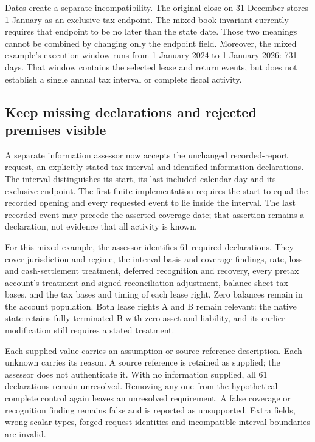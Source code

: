 Dates create a separate incompatibility. The original close on 31 December
stores 1 January as an exclusive tax endpoint. The mixed-book invariant
currently requires that endpoint to be no later than the state date. Those
two meanings cannot be combined by changing only the endpoint field. Moreover,
the mixed example's execution window runs from 1 January 2024 to 1 January 2026:
731 days. That window contains the selected lease and return events, but does
not establish a single annual tax interval or complete fiscal activity.

\subsection{Keep missing declarations and rejected premises visible}

A separate information assessor now accepts the unchanged recorded-report
request, an explicitly stated tax interval and identified information
declarations. The interval distinguishes its start, its last included calendar
day and its exclusive endpoint. The first finite implementation requires the
start to equal the recorded opening and every requested event to lie inside
the interval. The last recorded event may precede the asserted coverage date;
that assertion remains a declaration, not evidence that all activity is known.

For this mixed example, the assessor identifies 61 required declarations. They
cover jurisdiction and regime, the interval basis and coverage findings, rate,
loss and cash-settlement treatment, deferred recognition and recovery, every
pretax account's treatment and signed reconciliation adjustment, balance-sheet
tax bases, and the tax bases and timing of each lease right. Zero balances
remain in the account population. Both lease rights A and B remain relevant:
the native state retains fully terminated B with zero asset and liability,
and its earlier modification still requires a stated treatment.

Each supplied value carries an assumption or source-reference description.
Each unknown carries its reason. A source reference is retained as supplied;
the assessor does not authenticate it. With no information supplied, all
61 declarations remain unresolved. Removing any one from the hypothetical
complete control again leaves an unresolved requirement. A false coverage or
recognition finding remains false and is reported as unsupported. Extra fields,
wrong scalar types, forged request identities and incompatible interval
boundaries are invalid.

